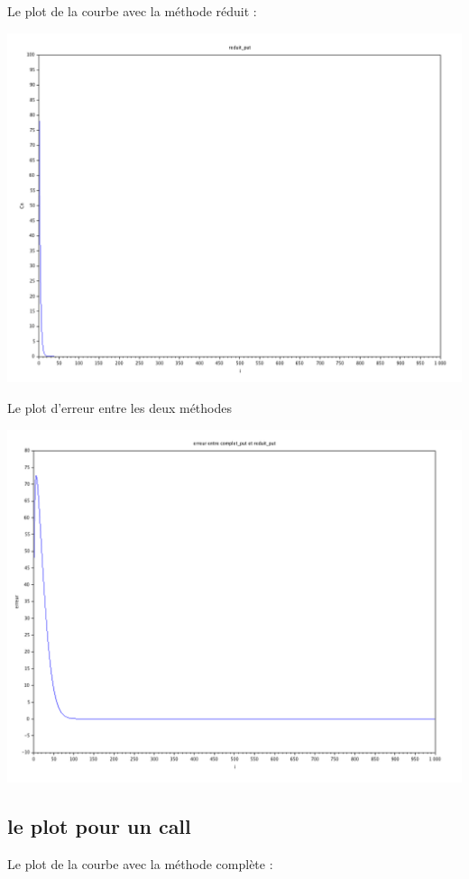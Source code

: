 \documentclass[a4paper, 12pt]{article}
\begin{document}
Le plot de la courbe avec la méthode réduit :

\includegraphics[scale=0.8]{Images/reduit_put.png} 

Le plot d'erreur entre les deux méthodes

\includegraphics[scale=0.8]{Images/erreur_cp_rp.png} 



\subsection{le plot pour un call}
Le plot de la courbe avec la méthode complète :
\end{document}
